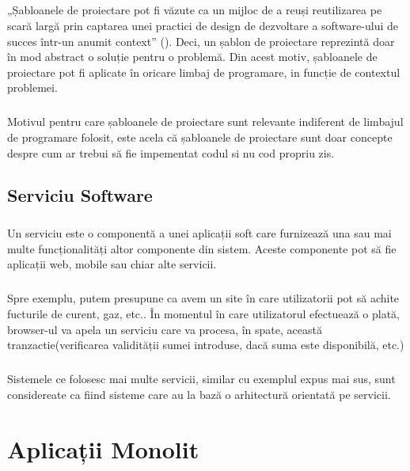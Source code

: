 \documentclass[12pt]{report}
\begin{document}
    \paragraph{}„Șabloanele de proiectare pot fi văzute ca un mijloc de a reuși reutilizarea pe scară largă prin captarea unei practici de design de dezvoltare a software-ului de succes într-un anumit context” (\cite{alencar1996formal}).
  Deci, un șablon de proiectare reprezintă doar în mod abstract o soluție pentru o problemă. Din acest motiv, șabloanele de proiectare pot fi aplicate în oricare limbaj de programare, in funcție de contextul problemei.
  \paragraph{}Motivul pentru care șabloanele de proiectare sunt relevante indiferent de limbajul de programare folosit, este acela că șabloanele de proiectare sunt doar concepte despre cum ar trebui să fie impementat codul si nu cod propriu zis.
  \section{Serviciu Software}
  \paragraph{}
  Un serviciu este o componentă a unei aplicații soft care furnizează una sau mai multe funcționalități altor componente din sistem. Aceste componente pot să fie aplicații web, mobile sau chiar alte servicii.
  \paragraph{}
  Spre exemplu, putem presupune ca avem un site în care utilizatorii pot să achite fucturile de curent, gaz, etc.. În momentul în care utilizatorul efectuează o plată, browser-ul va apela un serviciu care va procesa, în spate, această tranzactie(verificarea validității sumei introduse, dacă suma este disponibilă, etc.)
  \paragraph{}
  Sistemele ce folosesc mai multe servicii, similar cu exemplul expus mai sus, sunt considereate ca fiind sisteme care au la bază o arhitectură orientată pe servicii.
  \chapter{Aplicații Monolit}
\end{document}
